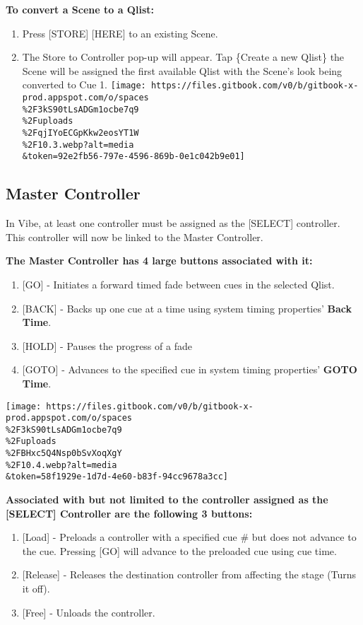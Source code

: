 \documentclass[
]{article}
\begin{document}
\textbf{To convert a Scene to a Qlist:}

\begin{enumerate}
\def\labelenumi{\arabic{enumi}.}
\item
  Press {[}STORE{]} {[}HERE{]} to an existing Scene.
\item
  The Store to Controller pop-up will appear. Tap \{Create a new Qlist\} the Scene will be assigned the first available Qlist with the Scene's look being converted to Cue 1.
  \texttt{[image: https://files.gitbook.com/v0/b/gitbook-x-prod.appspot.com/o/spaces\\\%2F3kS90tLsADGm1ocbe7q9\\\%2Fuploads\\\%2FqjIYoECGpKkw2eosYT1W\\\%2F10.3.webp?alt=media\\\&token=92e2fb56-797e-4596-869b-0e1c042b9e01]}
\end{enumerate}

\hypertarget{master-controller}{%
\subsection{Master Controller}\label{master-controller}}

In Vibe, at least one controller must be assigned as the {[}SELECT{]} controller. This controller will now be linked to the Master Controller.

\textbf{The Master Controller has 4 large buttons associated with it:}

\begin{enumerate}
\def\labelenumi{\arabic{enumi}.}
\item
  {[}GO{]} - Initiates a forward timed fade between cues in the selected Qlist.
\item
  {[}BACK{]} - Backs up one cue at a time using system timing properties' \textbf{Back Time}.
\item
  {[}HOLD{]} - Pauses the progress of a fade
\item
  {[}GOTO{]} - Advances to the specified cue in system timing properties' \textbf{GOTO Time}.
\end{enumerate}

\texttt{[image: https://files.gitbook.com/v0/b/gitbook-x-prod.appspot.com/o/spaces\\\%2F3kS90tLsADGm1ocbe7q9\\\%2Fuploads\\\%2FBHxc5Q4Nsp0bSvXoqXgY\\\%2F10.4.webp?alt=media\\\&token=58f1929e-1d7d-4e60-b83f-94cc9678a3cc]}

\textbf{Associated with but not limited to the controller assigned as the {[}SELECT{]} Controller are the following 3 buttons:}

\begin{enumerate}
\def\labelenumi{\arabic{enumi}.}
\item
  {[}Load{]} - Preloads a controller with a specified cue \# but does not advance to the cue. Pressing {[}GO{]} will advance to the preloaded cue using cue time.
\item
  {[}Release{]} - Releases the destination controller from affecting the stage (Turns it off).
\item
  {[}Free{]} - Unloads the controller.
\end{enumerate}
\end{document}
